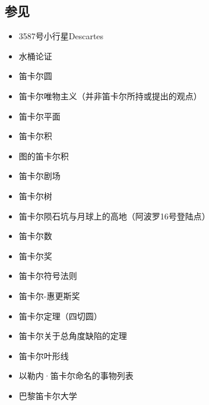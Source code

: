 \subsection{参见}
\begin{itemize}
\item 3587号小行星Descartes
\item 水桶论证
\item 笛卡尔圆
\item 笛卡尔唯物主义（并非笛卡尔所持或提出的观点）
\item 笛卡尔平面
\item 笛卡尔积
\item  图的笛卡尔积
\item 笛卡尔剧场
\item 笛卡尔树
\item 笛卡尔陨石坑与月球上的高地（阿波罗16号登陆点）
\item 笛卡尔数
\item 笛卡尔奖
\item 笛卡尔符号法则
\item 笛卡尔-惠更斯奖
\item 笛卡尔定理（四切圆）
\item 笛卡尔关于总角度缺陷的定理
\item 笛卡尔叶形线
\item 以勒内·笛卡尔命名的事物列表
\item 巴黎笛卡尔大学
\end{itemize}
